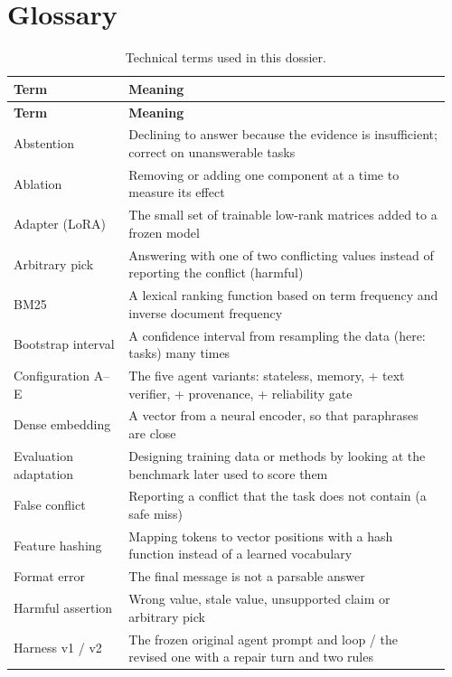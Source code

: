 \documentclass[10.5pt,a4paper,oneside]{report}
\begin{document}
\clearpage
\chapter*{Glossary}
\begingroup\small\setlength{\tabcolsep}{4pt}\renewcommand{\arraystretch}{1.18}
\begin{longtable}{>{\raggedright\arraybackslash}p{0.255\linewidth}>{\raggedright\arraybackslash}p{0.705\linewidth}}
\caption{Technical terms used in this dossier.}\\
\toprule
\textbf{Term} & \textbf{Meaning} \\
\midrule
\endfirsthead
\toprule
\textbf{Term} & \textbf{Meaning} \\
\midrule
\endhead
\bottomrule
\endlastfoot
Abstention & Declining to answer because the evidence is insufficient; correct on unanswerable tasks \\
Ablation & Removing or adding one component at a time to measure its effect \\
Adapter (LoRA) & The small set of trainable low-rank matrices added to a frozen model \\
Arbitrary pick & Answering with one of two conflicting values instead of reporting the conflict (harmful) \\
BM25 & A lexical ranking function based on term frequency and inverse document frequency \\
Bootstrap interval & A confidence interval from resampling the data (here: tasks) many times \\
Configuration A–E & The five agent variants: stateless, memory, + text verifier, + provenance, + reliability gate \\
Dense embedding & A vector from a neural encoder, so that paraphrases are close \\
Evaluation adaptation & Designing training data or methods by looking at the benchmark later used to score them \\
False conflict & Reporting a conflict that the task does not contain (a safe miss) \\
Feature hashing & Mapping tokens to vector positions with a hash function instead of a learned vocabulary \\
Format error & The final message is not a parsable answer \\
Harmful assertion & Wrong value, stale value, unsupported claim or arbitrary pick \\
Harness v1 / v2 & The frozen original agent prompt and loop / the revised one with a repair turn and two rules \\

\end{longtable}
\end{document}
